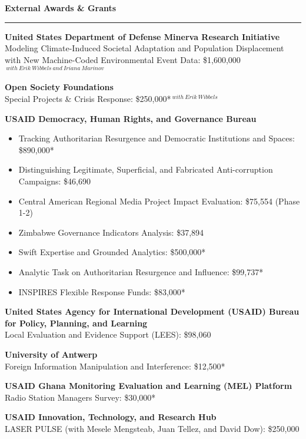 \documentclass[11pt]{article}
\begin{document}
\textbf{\large External Awards \& Grants}\\
\rule[3mm]{\textwidth}{.2pt}

\textbf{United States Department of Defense Minerva Research Initiative}\\
\hspace{1em} Modeling Climate-Induced Societal Adaptation and Population Displacement with New Machine-Coded Environmental Event Data: \$1,600,000$^{\ with\ Erik\ Wibbels\ and\ Iriana\ Marinov}$

\textbf{Open Society Foundations}\\
\hspace{1em} Special Projects \& Crisis Response: \$250,000*$^{\ with\ Erik\ Wibbels}$
\smallskip

\textbf{USAID Democracy, Human Rights, and Governance Bureau}
\begin{itemize} \itemsep -5pt
\item Tracking Authoritarian Resurgence and Democratic Institutions and Spaces: \$890,000*
\item Distinguishing Legitimate, Superficial, and Fabricated Anti-corruption Campaigns: \$46,690
\item Central American Regional Media Project Impact Evaluation: \$75,554 (Phase 1-2)
\item Zimbabwe Governance Indicators Analysis: \$37,894
\item Swift Expertise and Grounded Analytics: \$500,000*
\item Analytic Task on Authoritarian Resurgence and Influence: \$99,737*
\item INSPIRES Flexible Response Funds: \$83,000*
\end{itemize}

\textbf{United States Agency for International Development (USAID) Bureau for Policy, Planning, and Learning}\\
\hspace{1em} Local Evaluation and Evidence Support (LEES): \$98,060

\textbf{University of Antwerp}\\
\hspace{1em} Foreign Information Manipulation and Interference: \$12,500*

\textbf{USAID Ghana Monitoring Evaluation and Learning (MEL) Platform}\\
Radio Station Managers Survey: \$30,000*

\textbf{USAID Innovation, Technology, and Research Hub}\\
LASER PULSE (with Mesele Mengsteab, Juan Tellez, and David Dow): \$250,000
\end{document}
